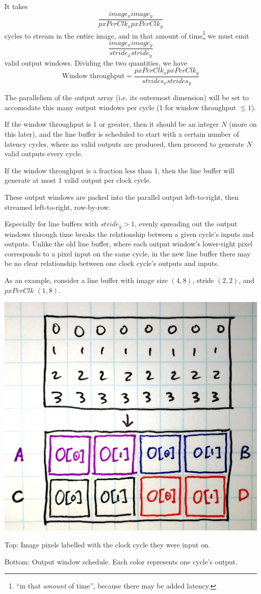 \documentclass[12pt]{article}
\begin{document}
It takes
\begin{equation}
\frac{image_x image_y}{pxPerClk_x pxPerClk_y}
\end{equation}
cycles to stream in the entire image, and in that amount of time\footnote{
``in that \textit{amount} of time'', because there may be added latency.}
we must emit
\begin{equation}
\frac{image_x image_y}{stride_x stride_y}
\end{equation}
valid output windows. Dividing the two quantities, we have
\begin{equation}
    \text{Window throughput} = \frac
      {pxPerClk_x pxPerClk_y}{strides_x strides_y}
\end{equation}

The parallelism of the output array (i.e. its outermost dimension)
will be set to accomodate this many output windows per cycle (1 for
window throughput $\le1$).

If the window throughput is 1 or greater, then it should be an integer
$N$ (more on this later), and the line buffer is scheduled to start
with a certain number of latency cycles, where no valid outputs are
produced, then proceed to generate $N$ valid outputs every cycle.

If the window throughput is a fraction less than 1, then the line
buffer will generate at most 1 valid output per clock cycle.

These output windows are packed into the parallel output left-to-right,
then streamed left-to-right, row-by-row.

Especially for line buffers with $stride_y > 1$, evenly spreading out
the output windows through time breaks the relationship between a
given cycle's inputs and outputs. Unlike the old line buffer, where
each output window's lower-right pixel corresponds to a pixel input on
the same cycle, in the new line buffer there may be no clear
relationship between one clock cycle's outputs and inputs.

As an example, consider a line buffer with image size $(4,8)$,
stride $(2,2)$, and $pxPerClk$ $(1,8)$.

\begin{center}
\includegraphics[width=0.6\linewidth]{Figures/lb-schedule.jpg}

Top: Image pixels labelled with the clock cycle they were input on.

Bottom: Output window schedule. Each color represents one cycle's output.
\end{center}
\end{document}
